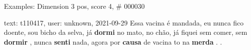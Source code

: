 \begin{frame}{Examples: Dimension 3 pos, score 4, \# 000030}
\footnotesize
\begin{exampleblock}{text: t110417, user: unknown, 2021-09-29}
Essa vacina é mandada, eu nunca fico doente, sou bicho da selva, já 
\textbf{dormi} no mato, no chão, já fiquei sem comer, sem \textbf{dormir} , 
nunca \textbf{senti} nada, agora por \textbf{causa} de vacina to na 
\textbf{merda} . .  
\end{exampleblock}
\end{frame}
